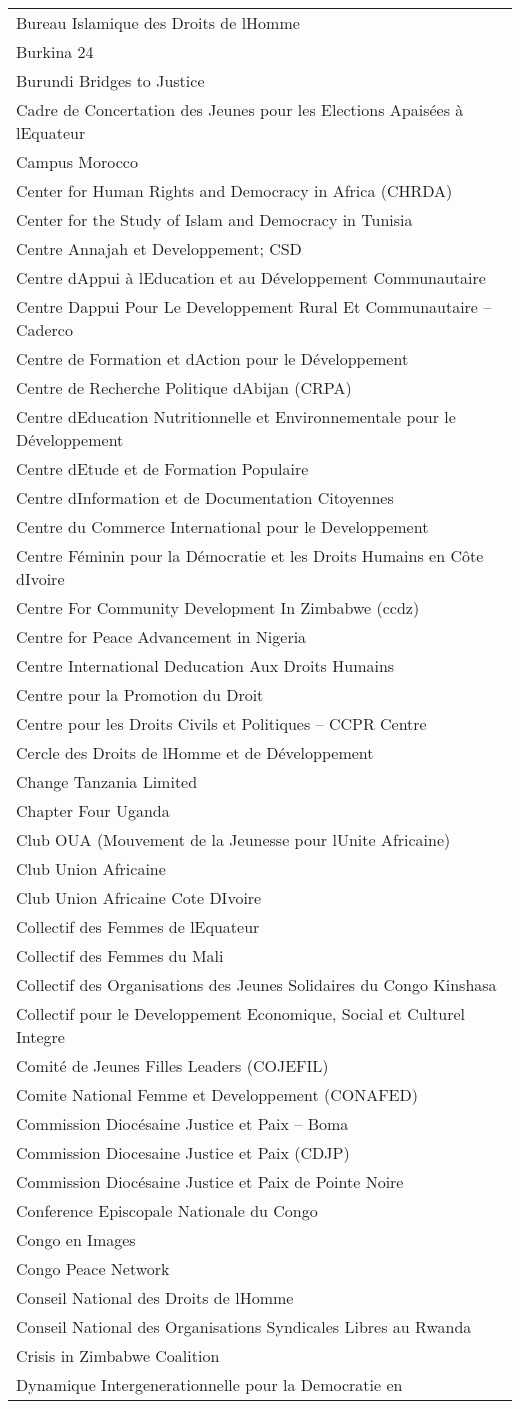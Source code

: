 \begin{longtable}[]{@{}l@{}}
Bureau Islamique des Droits de lHomme\tabularnewline
Burkina 24\tabularnewline
Burundi Bridges to Justice\tabularnewline
Cadre de Concertation des Jeunes pour les Elections Apaisées à
lEquateur\tabularnewline
Campus Morocco\tabularnewline
Center for Human Rights and Democracy in Africa (CHRDA)\tabularnewline
Center for the Study of Islam and Democracy in Tunisia\tabularnewline
Centre Annajah et Developpement; CSD\tabularnewline
Centre dAppui à lEducation et au Développement
Communautaire\tabularnewline
Centre Dappui Pour Le Developpement Rural Et Communautaire --
Caderco\tabularnewline
Centre de Formation et dAction pour le Développement\tabularnewline
Centre de Recherche Politique dAbijan (CRPA)\tabularnewline
Centre dEducation Nutritionnelle et Environnementale pour le
Développement\tabularnewline
Centre dEtude et de Formation Populaire\tabularnewline
Centre dInformation et de Documentation Citoyennes\tabularnewline
Centre du Commerce International pour le Developpement\tabularnewline
Centre Féminin pour la Démocratie et les Droits Humains en Côte
dIvoire\tabularnewline
Centre For Community Development In Zimbabwe (ccdz)\tabularnewline
Centre for Peace Advancement in Nigeria\tabularnewline
Centre International Deducation Aux Droits Humains\tabularnewline
Centre pour la Promotion du Droit\tabularnewline
Centre pour les Droits Civils et Politiques -- CCPR
Centre\tabularnewline
Cercle des Droits de lHomme et de Développement\tabularnewline
Change Tanzania Limited\tabularnewline
Chapter Four Uganda\tabularnewline
Club OUA (Mouvement de la Jeunesse pour lUnite Africaine)\tabularnewline
Club Union Africaine\tabularnewline
Club Union Africaine Cote DIvoire\tabularnewline
Collectif des Femmes de lEquateur\tabularnewline
Collectif des Femmes du Mali\tabularnewline
Collectif des Organisations des Jeunes Solidaires du Congo
Kinshasa\tabularnewline
Collectif pour le Developpement Economique, Social et Culturel
Integre\tabularnewline
Comité de Jeunes Filles Leaders (COJEFIL)\tabularnewline
Comite National Femme et Developpement (CONAFED)\tabularnewline
Commission Diocésaine Justice et Paix -- Boma\tabularnewline
Commission Diocesaine Justice et Paix (CDJP)\tabularnewline
Commission Diocésaine Justice et Paix de Pointe Noire\tabularnewline
Conference Episcopale Nationale du Congo\tabularnewline
Congo en Images\tabularnewline
Congo Peace Network\tabularnewline
Conseil National des Droits de lHomme\tabularnewline
Conseil National des Organisations Syndicales Libres au
Rwanda\tabularnewline
Crisis in Zimbabwe Coalition\tabularnewline
Dynamique Intergenerationnelle pour la Democratie en

\end{longtable}
